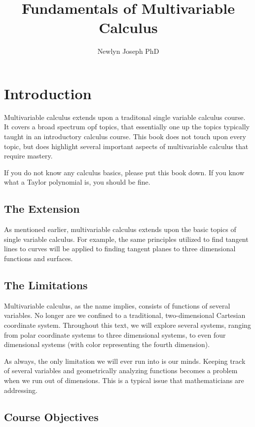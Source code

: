 \documentclass[12pt]{article}
\begin{document}
\title{Fundamentals of Multivariable Calculus}
\author{Newlyn Joseph PhD}

\maketitle

\section{Introduction}

Multivariable calculus extends upon a traditonal single variable calculus course. It covers a broad spectrum opf topics, that essentially one up the topics typically taught in an introductory calculus course. This book does not touch upon every topic, but does highlight several important aspects of multivariable calculus that require mastery.

If you do not know any calculus basics, please put this book down. If you know what a Taylor polynomial is, you should be fine.

\subsection{The Extension}

As mentioned earlier, multivariable calculus extends upon the basic topics of single variable calculus. For example, the same principles utilized to find tangent lines to curves will be applied to finding tangent planes to three dimensional functions and surfaces.

\subsection{The Limitations}

Multivariable calculus, as the name implies, consists of functions of several variables. No longer are we confined to a traditional, two-dimensional Cartesian coordinate system. Throughout this text, we will explore several systems, ranging from polar coordinate systems to three dimensional systems, to even four dimensional systems (with color representing the fourth dimension).

As always, the only limitation we will ever run into is our minds. Keeping track of several variables and geometrically analyzing functions becomes a problem when we run out of dimensions. This is a typical issue that mathematicians are addressing.

\subsection{Course Objectives}
\end{document}
